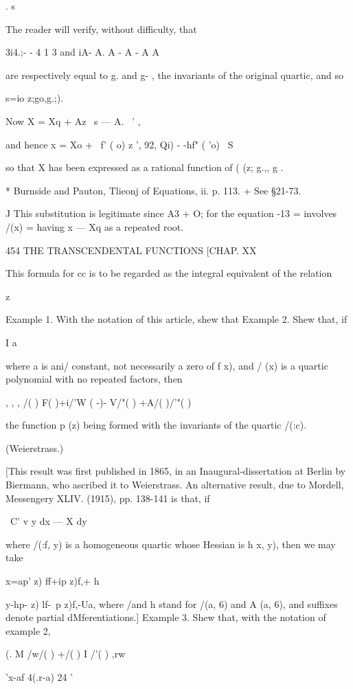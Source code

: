 {. s

The reader will verify, without difficulty, that

3i4.;- - 4 1 3 and iA- A. A - A - A A

are respectively equal to g. and g- , the invariants of the original
quartic, and so

s=io z;go,g.;).

Now X = Xq + Az \ s — A. ~' ,

and hence x = Xo + \ f' ( o) z ', 92, Qi) - -hf" ( 'o) ~S

so that X has been expressed as a rational function of ( (z; g.,, g .

* Burnside and Pauton, Tlieonj of Equations, ii. p. 113. + See §21-73.

J This substitution is legitimate since A3 + O; for the equation -13 =
involves /(x) = having x — Xq as a repeated root.

454 THE TRANSCENDENTAL FUNCTIONS [CHAP. XX

This formula for cc is to be regarded as the integral equivalent of
the relation

z

Example 1. With the notation of this article, shew that Example 2.
Shew that, if

I a

where a is ani/ constant, not necessarily a zero of f x), and / (x) is
a quartic polynomial with no repeated factors, then

, , , /( ) F( )+i/'W ( -)- V/"( ) +A/( )/'"( )

the function p (z) being formed with the invariants of the quartic
/(:c).

(Weierstrass.)

[This result was first published in 1865, in an Inaugural-dissertation
at Berlin by Biermann, who ascribed it to Weierstrass. An alternative
result, due to Mordell, Messengery XLIV. (1915), pp. 138-141 is that,
if

\ C' v y dx — X dy

where /(:f, y) is a homogeneous quartic whose Hessian is h x, y), then
we may take

x=ap' z) ff+ip z)f,+ h

y-hp- z) lf-\ p z)f,-Ua, where /and h stand for /(a, 6) and A (a, 6),
and suffixes denote partial dMferentiations.] Example 3. Shew that,
with the notation of example 2,

(. M /w/( ) +/( ) I /'( ) ,rw

 'x-af 4(.r-a) 24 '

}
